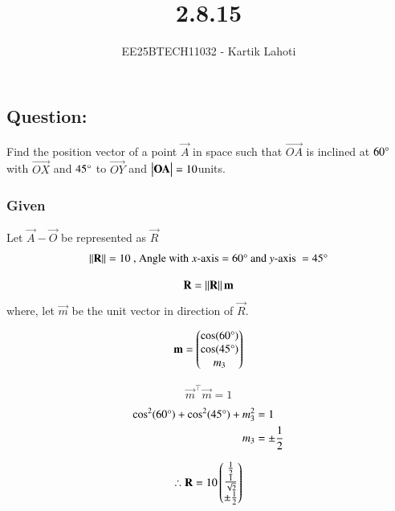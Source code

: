 \documentclass[journal]{IEEEtran}
\numberwithin{equation}{enumi}
\numberwithin{figure}{enumi}
\begin{document}

\vspace{3cm}

\title{2.8.15}
\author{EE25BTECH11032 - Kartik Lahoti}
\maketitle

\subsection*{Question: } 
Find the position vector of a point $\vec{A}$ in space such that $\vec{OA}$ is inclined at $60\degree$ with $\vec{OX}$ and $45\degree$ to $\vec{OY}$ and $\begin{vmatrix}\mathbf{OA}\end{vmatrix} = 10 $units.

\solution 

\subsubsection*{Given }
Let $\vec{A} - \vec{O}$ be represented as $\vec{R}$
\begin{align}
    \left\lVert\mathbf{R}\right\rVert = 10 \text{ , Angle with } x\text{-axis} = 60\degree \text{ and } y\text{-axis } = 45\degree
\end{align}

\begin{align}
    \mathbf{R} = \left\lVert\mathbf{R}\right\rVert \mathbf{m} 
\end{align}
where, let $\vec{m}$ be the unit vector in direction of $\vec{R}$. 

\begin{align}
    \mathbf{m} = \begin{pmatrix}\cos(60\degree) \\ \cos(45\degree) \\ m_3 \end{pmatrix}
\end{align}

\begin{align}
    \vec{m}^{\top}\vec{m} = 1
\end{align}
\begin{align}
    \cos^2(60\degree) + \cos^2(45\degree) + m_3^2 &= 1 \\ 
    m_3 &=\pm \frac{1}{2}  
\end{align}

\begin{align}
    \therefore \mathbf{R} = 10\begin{pmatrix}\frac{1}{2} \\ \frac{1}{\sqrt{2}} \\ \pm \frac{1}{2}\end{pmatrix}
\end{align}
\end{document}
